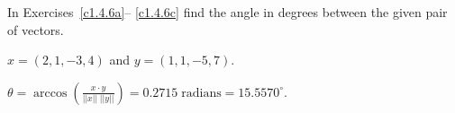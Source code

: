 \documentclass{ximera}
\begin{document}



\matlabproblemlabel

\noindent In Exercises~\ref{c1.4.6a}-- \ref{c1.4.6c} find the angle in
degrees between the given pair of vectors.


\begin{computerExercise} \label{c1.4.6a}
$x=(2,1,-3,4)$ and $y=(1,1,-5,7)$.

\begin{solution}
\ans $\theta =
\arccos \left(\frac{x \cdot y}{||x||\;||y||}\right) =
0.2715 \; \mbox{radians} = 15.5570^\circ$.

\end{solution}
\end{computerExercise}


\end{document}
